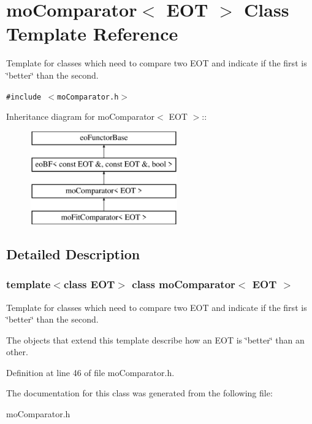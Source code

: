 \section{moComparator$<$ EOT $>$ Class Template Reference}
\label{classmo_comparator}
Template for classes which need to compare two EOT and indicate if the first is \char`\"{}better\char`\"{} than the second.  


{\tt \#include $<$moComparator.h$>$}

Inheritance diagram for moComparator$<$ EOT $>$::\begin{figure}[H]
\begin{center}
\leavevmode
\includegraphics[height=4cm]{classmo_comparator}
\end{center}
\end{figure}


\subsection{Detailed Description}
\subsubsection*{template$<$class EOT$>$ class moComparator$<$ EOT $>$}

Template for classes which need to compare two EOT and indicate if the first is \char`\"{}better\char`\"{} than the second. 

The objects that extend this template describe how an EOT is \char`\"{}better\char`\"{} than an other. 



Definition at line 46 of file moComparator.h.

The documentation for this class was generated from the following file:\begin{CompactItemize}
\item 
moComparator.h\end{CompactItemize}

